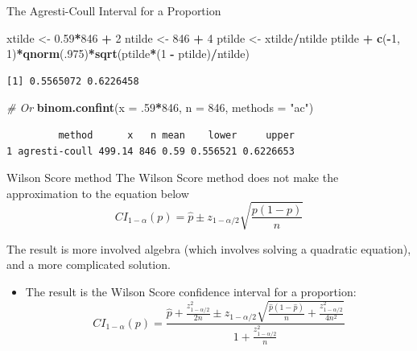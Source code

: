 \documentclass[
  ignorenonframetext,
]{beamer}
\newenvironment{Shaded}{\begin{snugshade}}{\end{snugshade}}
\newcommand{\AttributeTok}[1]{\textcolor[rgb]{0.13,0.29,0.53}{#1}}
\newcommand{\CommentTok}[1]{\textcolor[rgb]{0.56,0.35,0.01}{\textit{#1}}}
\newcommand{\DecValTok}[1]{\textcolor[rgb]{0.00,0.00,0.81}{#1}}
\newcommand{\FloatTok}[1]{\textcolor[rgb]{0.00,0.00,0.81}{#1}}
\newcommand{\FunctionTok}[1]{\textcolor[rgb]{0.13,0.29,0.53}{\textbf{#1}}}
\newcommand{\NormalTok}[1]{#1}
\newcommand{\OtherTok}[1]{\textcolor[rgb]{0.56,0.35,0.01}{#1}}
\newcommand{\SpecialCharTok}[1]{\textcolor[rgb]{0.81,0.36,0.00}{\textbf{#1}}}
\newcommand{\StringTok}[1]{\textcolor[rgb]{0.31,0.60,0.02}{#1}}
\providecommand{\tightlist}{%
  \setlength{\itemsep}{0pt}\setlength{\parskip}{0pt}}
\begin{document}
\begin{frame}[fragile]{The Agresti-Coull Interval for a Proportion}
\label{the-agresti-coull-interval-for-a-proportion-2}
\small

\begin{Shaded}
\begin{Highlighting}[]
\NormalTok{xtilde }\OtherTok{\textless{}{-}} \FloatTok{0.59}\SpecialCharTok{*}\DecValTok{846} \SpecialCharTok{+} \DecValTok{2}
\NormalTok{ntilde }\OtherTok{\textless{}{-}} \DecValTok{846} \SpecialCharTok{+} \DecValTok{4}
\NormalTok{ptilde }\OtherTok{\textless{}{-}}\NormalTok{ xtilde}\SpecialCharTok{/}\NormalTok{ntilde}
\NormalTok{ptilde }\SpecialCharTok{+} \FunctionTok{c}\NormalTok{(}\SpecialCharTok{{-}}\DecValTok{1}\NormalTok{, }\DecValTok{1}\NormalTok{)}\SpecialCharTok{*}\FunctionTok{qnorm}\NormalTok{(.}\DecValTok{975}\NormalTok{)}\SpecialCharTok{*}\FunctionTok{sqrt}\NormalTok{(ptilde}\SpecialCharTok{*}\NormalTok{(}\DecValTok{1} \SpecialCharTok{{-}}\NormalTok{ ptilde)}\SpecialCharTok{/}\NormalTok{ntilde)}
\end{Highlighting}
\end{Shaded}

\begin{verbatim}
[1] 0.5565072 0.6226458
\end{verbatim}

\begin{Shaded}
\begin{Highlighting}[]
\CommentTok{\# Or}
\FunctionTok{binom.confint}\NormalTok{(}\AttributeTok{x =}\NormalTok{ .}\DecValTok{59}\SpecialCharTok{*}\DecValTok{846}\NormalTok{, }\AttributeTok{n =} \DecValTok{846}\NormalTok{, }\AttributeTok{methods =} \StringTok{"ac"}\NormalTok{)}
\end{Highlighting}
\end{Shaded}

\begin{verbatim}
         method      x   n mean    lower     upper
1 agresti-coull 499.14 846 0.59 0.556521 0.6226653
\end{verbatim}

\normalsize
\end{frame}

\begin{frame}{Wilson Score method}
\label{wilson-score-method}
The Wilson Score method does not make the approximation to the equation
below
\[CI_{1 - \alpha}(p)=\hat{p}\pm z_{1-\alpha/2}\sqrt{\frac{p(1-p)}{n}}\]

The result is more involved algebra (which involves solving a quadratic
equation), and a more complicated solution.

\begin{itemize}
\tightlist
\item
  The result is the Wilson Score confidence interval for a proportion:
  \[CI_{1-\alpha}(p)=\frac{\hat{p}+\frac{z^2_{1-\alpha/2}}{2n}\pm z_{1-\alpha/2}\sqrt{\frac{\hat{p}(1-\hat{p})}{n}+\frac{z^2_{1-\alpha/2}}{4n^2}}}{1+\frac{z^2_{1-\alpha/2}}{n}}\]
\end{itemize}
\end{frame}
\end{document}
